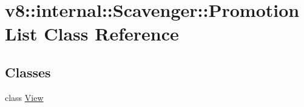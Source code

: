 \hypertarget{classv8_1_1internal_1_1Scavenger_1_1PromotionList}{}\section{v8\+:\+:internal\+:\+:Scavenger\+:\+:Promotion\+List Class Reference}
\label{classv8_1_1internal_1_1Scavenger_1_1PromotionList}
\subsection*{Classes}
\begin{DoxyCompactItemize}
\item 
class \mbox{\hyperlink{classv8_1_1internal_1_1Scavenger_1_1PromotionList_1_1View}{View}}
\end{DoxyCompactItemize}
